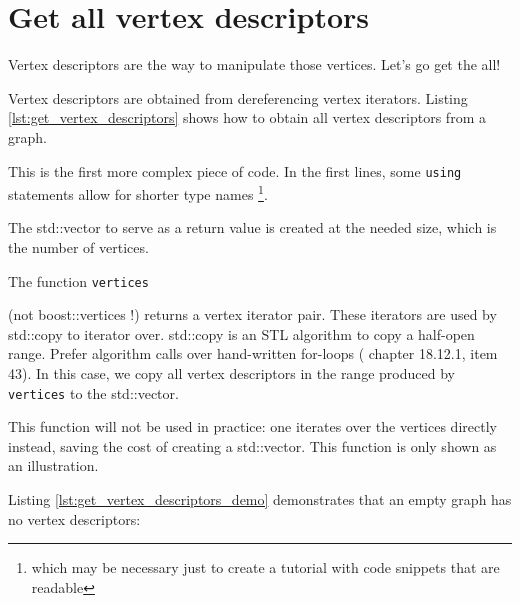 

\section{Get all vertex descriptors}
\label{subsec:get_vertex_descriptors}

Vertex descriptors are the way to manipulate those vertices.
Let's go get the all!

Vertex descriptors are obtained from dereferencing vertex iterators.
Listing \ref{lst:get_vertex_descriptors}
shows how to obtain all vertex descriptors from a graph.



This is the first more complex piece of code.
In the first lines, some \verb;using; statements allow for shorter type names
\footnote{
  which may be necessary just to create a tutorial 
  with code snippets that are readable
}.

The std::vector to serve as a return value is created at the needed size,
which is the number of vertices.

The function \verb;vertices; 

(not boost::vertices !) 
returns a vertex iterator pair.
These iterators are used by std::copy to iterator over.
std::copy 
is an STL algorithm to copy a half-open range.
Prefer algorithm calls over hand-written for-loops (
\cite{stroustrup1997} chapter 18.12.1, 
\cite{meyers2005effective} item 43).
In this case, we copy all vertex descriptors in the range produced 
by \verb;vertices; to the std::vector.

This function will not be used in practice: one iterates over the vertices
directly instead, saving the cost of creating a std::vector.
This function is only shown as an illustration.

Listing \ref{lst:get_vertex_descriptors_demo}
demonstrates that an empty graph has no vertex descriptors:



